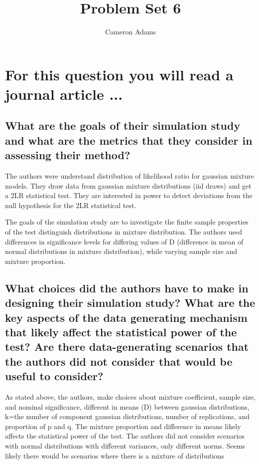 \documentclass{article}\usepackage[]{graphicx}\usepackage[]{color}
\title{Problem Set 6}
\author{Cameron Adams}
\begin{document}

\maketitle






\section{For this question you will read a journal article ...}

\subsection{What are the goals of their simulation study and what are the metrics that they consider in assessing their method?}

The authors were understand distribution of likelihood ratio for gaussian mixture models. They draw data from gaussian mixture distributions (iid draws) and get a 2LR statistical test. They are interested in power to detect deviations from the null hypothesis for the 2LR statistical test.

The goals of the simulation study are to investigate the finite sample properties of the test distinguish distributions in mixture distribution. The authors used differences in significance levels for differing values of D (difference in mean of normal distributions in mixture distribution), while varying sample size and mixture proportion. 

\subsection{What choices did the authors have to make in designing their simulation study? What are the key aspects of the data generating mechanism that likely affect the statistical power of the test? Are there data-generating scenarios that the authors did not consider that would be useful to consider?}

As stated above, the authors, make choices about mixture coefficient, sample size, and nominal significance, different in means (D) between gaussian distributions, k=the number of component gaussian distributions, number of replications, and proportion of p and q. The mixture proportion and difference in means likely affects the statistical power of the test. The authors did not consider scenarios with normal distributions with different variances, only different norms. Seems likely there would be scenarios where there is a mixture of distributions
\end{document}
